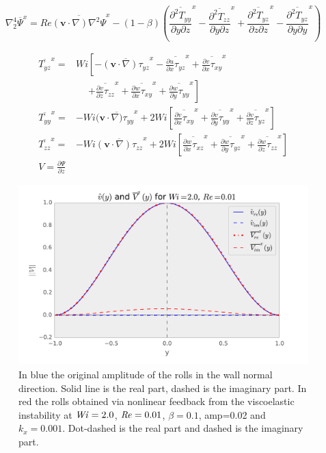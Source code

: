 \documentclass{jfm}
\newcommand\Wi{\mbox{\textit{Wi}}}
\newcommand{\xmean}[1]{\overline{#1}^{x}}
\newcommand\Rey{\mbox{\textit{Re}}}  %
\begin{document}
\begin{equation}
    \nabla^{4}_{2} \xmean{\Psi}  = \mathit{Re} \xmean{(\mathbf{v} \cdot \nabla)
    \nabla^{2} \Psi} - \left(1-\beta \right) \left(\xmean{\frac{\partial^{2}
    T_{yy}}{\partial y \partial z}} - \xmean{\frac{\partial^{2}
    T_{zz}}{\partial y \partial z}} + \xmean{\frac{\partial^{2}
    T_{yz}}{\partial z \partial z}} - \xmean{\frac{\partial^{2}
    T_{yz}}{\partial y \partial y}} \right)
\end{equation}

\begin{align}
\xmean{T_{yz}} =& Wi \left[ -\xmean{(\mathbf{v} \cdot \nabla) \tau_{yz}} -
\xmean{\frac{\partial u}{\partial x}\tau_{yz}} + \xmean{\frac{\partial
v}{\partial x} \tau_{xy}} \right. \\
& \phantom{Wi } \left. + \xmean{\frac{\partial v}{\partial z} \tau_{zz}} +
\xmean{\frac{\partial w}{\partial x} \tau_{xy}} + \xmean{\frac{\partial
w}{\partial y} \tau_{yy}} \right] \\
\xmean{T_{yy}} =& -Wi(\xmean{\mathbf{v}\cdot \nabla) \tau_{yy}} + 2Wi\left[
\xmean{\frac{\partial v}{\partial x}\tau_{xy}} + \xmean{\frac{\partial
v}{\partial y} \tau_{yy}} + \xmean{\frac{\partial v}{\partial z} \tau_{yz}}
\right] \\
\xmean{T_{zz}} =& -Wi\xmean{(\mathbf{v}\cdot \nabla) \tau_{zz}} + 2Wi\left[
\xmean{\frac{\partial w}{\partial x}\tau_{xz}} + \xmean{\frac{\partial
w}{\partial y} \tau_{yz}} + \xmean{\frac{\partial w}{\partial z} \tau_{zz}}
\right] \\
V = \frac{\partial \Psi}{\partial z}
\end{align}

\begin{figure}
    \centering
    \includegraphics[width=\textwidth]{./figures/nonlin_forcing}
    \caption{
	In blue the original amplitude of the rolls in the wall normal
	direction. Solid line is the real part, dashed is the imaginary part.
	In red the rolls obtained via nonlinear feedback from the viscoelastic
	instability at $\Wi = 2.0$, $\Rey = 0.01$, $\beta=0.1$, amp=0.02 and
	$k_x = 0.001$. Dot-dashed is the real part and dashed is the imaginary
	part.
    }
    \label{fig:eigenmode_visco}
\end{figure}
\end{document}
